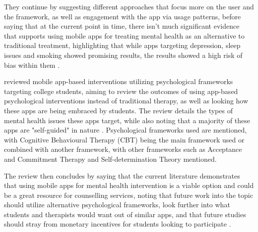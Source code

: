 \documentclass[12pt]{article}
\begin{document}
They continue by suggesting different approaches that focus more on the user and the framework, as well as 
engagement with the app via usage patterns,
before saying that at the current point in time, there isn't much significant evidence 
that supports using mobile apps for treating mental health as an alternative to traditional treatment, highlighting that
while apps targeting depression, sleep issues and smoking showed promising results, the results showed a high
risk of bias within them \autocite{RefWorks:RefID:87-weisel2019standalone}. \newline

\textcite{RefWorks:RefID:75-oliveira2021effectiveness} reviewed mobile app-based 
interventions utilizing psychological frameworks targeting college students, aiming to review the outcomes of 
using app-based psychological interventions instead of traditional therapy, as well as looking how these apps are 
being embraced by students. The review details the types of mental health issues these apps target, while also 
noting that a majority of these apps are "self-guided" in nature 
\autocite{RefWorks:RefID:75-oliveira2021effectiveness}. Psychological frameworks used are mentioned, with 
Cognitive Behavioural Therapy (CBT) being 
the main framework used or combined with another framework, with other frameworks such as 
Acceptance and Commitment Therapy and Self-determination Theory mentioned. \newline



The review then concludes by saying that the current literature demonstrates that using mobile apps for mental
health intervention is a viable option and could be a great resource for
counselling services, noting that future work into the topic should utilize alternative psychological
frameworks, look further into what students and therapists would want out of similar apps, and that
future studies should stray from monetary incentives for students looking to participate
\autocite{RefWorks:RefID:75-oliveira2021effectiveness}.
\end{document}
